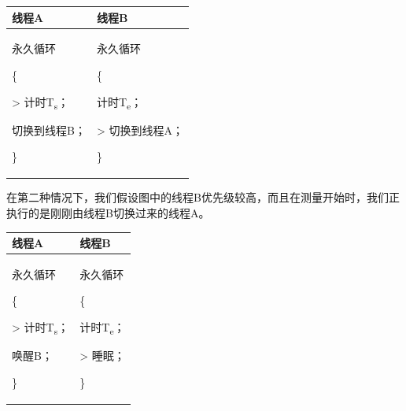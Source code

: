 \label{tab:thread-switch-first-case}

{\def\LTcaptype{none} %
\begin{longtable}[]{@{}
  >{\raggedright\arraybackslash}p{}
  >{\raggedright\arraybackslash}p{}@{}}
\toprule\noalign{}
\begin{minipage}[b]{\linewidth}\raggedright
线程A
\end{minipage} & \begin{minipage}[b]{\linewidth}\raggedright
线程B
\end{minipage} \\
\midrule\noalign{}
\endhead
\bottomrule\noalign{}
\endlastfoot
永久循环

\{

\textgreater{} 计时T\textsubscript{s}；

切换到线程B；

\} & 永久循环

\{

计时T\textsubscript{e}；

\textgreater{} 切换到线程A；

\} \\
\end{longtable}
}

在第二种情况下，我们假设图中的线程B优先级较高，而且在测量开始时，我们正执行的是刚刚由线程B切换过来的线程A。

\label{tab:thread-switch-second-case}

{\def\LTcaptype{none} %
\begin{longtable}[]{@{}
  >{\raggedright\arraybackslash}p{}
  >{\raggedright\arraybackslash}p{}@{}}
\toprule\noalign{}
\begin{minipage}[b]{\linewidth}\raggedright
线程A
\end{minipage} & \begin{minipage}[b]{\linewidth}\raggedright
线程B
\end{minipage} \\
\midrule\noalign{}
\endhead
\bottomrule\noalign{}
\endlastfoot
永久循环

\{

\textgreater{} 计时T\textsubscript{s}；

唤醒B；

\} & 永久循环

\{

计时T\textsubscript{e}；

\textgreater{} 睡眠；

\} \\
\end{longtable}
}

